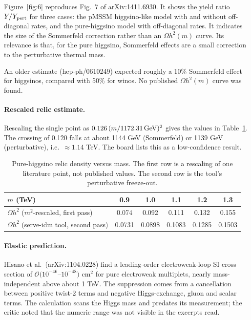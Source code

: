 \documentclass[11pt,a4paper]{article}
\begin{document}
Figure~\ref{fig:6} reproduces Fig.~7 of arXiv:1411.6930. It shows the yield ratio $Y/Y_{\rm pert}$ for three cases: the pMSSM higgsino-like model with and without off-diagonal rates, and the pure-higgsino model with off-diagonal rates. It indicates the size of the Sommerfeld correction rather than an $\Omega h^2(m)$ curve. Its relevance is that, for the pure higgsino, Sommerfeld effects are a small correction to the perturbative thermal mass.

An older estimate (hep-ph/0610249) expected roughly a 10\% Sommerfeld effect for higgsinos, compared with 50\% for winos. No published $\Omega h^2(m)$ curve was found.

\paragraph{Rescaled relic estimate.} Rescaling the single point as $0.126\,(m/1172.31\,{\rm GeV})^2$ gives the values in Table~\ref{tab:resc}. The crossing of 0.120 falls at about 1144 GeV (Sommerfeld) or 1139 GeV (perturbative), i.e.\ $\approx1.14$ TeV. The board lists this as a low-confidence result.

\begin{table}[h]
\centering
\begin{tabular}{lccccc}
\toprule
$m$ (TeV) & 0.9 & 1.0 & 1.1 & 1.2 & 1.3\\
\midrule
$\Omega h^2$ ($m^2$-rescaled, first pass) & 0.074 & 0.092 & 0.111 & 0.132 & 0.155\\
$\Omega h^2$ (serve-idm tool, second pass) & 0.0731 & 0.0898 & 0.1083 & 0.1285 & 0.1503\\
\bottomrule
\end{tabular}
\caption{Pure-higgsino relic density versus mass. The first row is a rescaling of one literature point, not published values. The second row is the tool's perturbative freeze-out.}
\label{tab:resc}
\end{table}

\paragraph{Elastic prediction.} Hisano et al.\ (arXiv:1104.0228) find a leading-order electroweak-loop SI cross section of $\mathcal{O}(10^{-46}$--$10^{-48})$ cm$^2$ for pure electroweak multiplets, nearly mass-independent above about 1 TeV. The suppression comes from a cancellation between positive twist-2 terms and negative Higgs-exchange, gluon and scalar terms. The calculation scans the Higgs mass and predates its measurement; the critic noted that the numeric range was not visible in the excerpts read.
\end{document}
